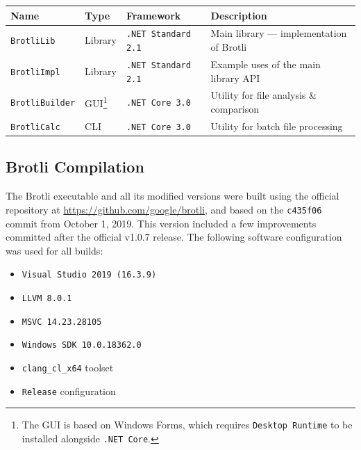\documentclass[english,master,dept460,male,cpp,cpdeclaration]{diploma}
\newcommand{\nosep}{\itemsep0em}
\begin{document}
	\bigskip
	\noindent
	\begin{tabularx}{\textwidth}{ l | l | l | X }
	Name & Type & Framework & Description \\
	\hline
	\verb|Brotli|\hspace{2.5pt}\verb|Lib| & Library & \verb|.NET Standard 2.1| & Main library --- implementation of Brotli \\
	\verb|Brotli|\hspace{2.5pt}\verb|Impl| & Library & \verb|.NET Standard 2.1| & Example uses of the main library API \\
	\verb|Brotli|\hspace{2.5pt}\verb|Builder| & GUI\footnote{The GUI is based on Windows Forms, which requires \verb|Desktop Runtime| to be installed alongside \verb|.NET Core|.} & \verb|.NET Core 3.0| & Utility for file analysis \& comparison \\
	\verb|Brotli|\hspace{2.5pt}\verb|Calc| & CLI & \verb|.NET Core 3.0| & Utility for batch file processing \\
	\end{tabularx}
	
	\bigskip
	\noindent
	
	\subsection{Brotli Compilation}
	\label{sec:brotli-compilation}
	
	The Brotli executable and all its modified versions were built using the official repository at \url{https://github.com/google/brotli}, and based on the \verb|c435f06| commit from October 1, 2019. This version included a few improvements committed after the official v1.0.7 release. The following software configuration was used for all builds:
	
	\begin{itemize} \nosep
		\item \verb|Visual Studio 2019 (16.3.9)|
		\item \verb|LLVM 8.0.1|
		\item \verb|MSVC 14.23.28105|
		\item \verb|Windows SDK 10.0.18362.0|
		\item \verb|clang_cl_x64| toolset
		\item \verb|Release| configuration
	\end{itemize}
	
\end{document}
